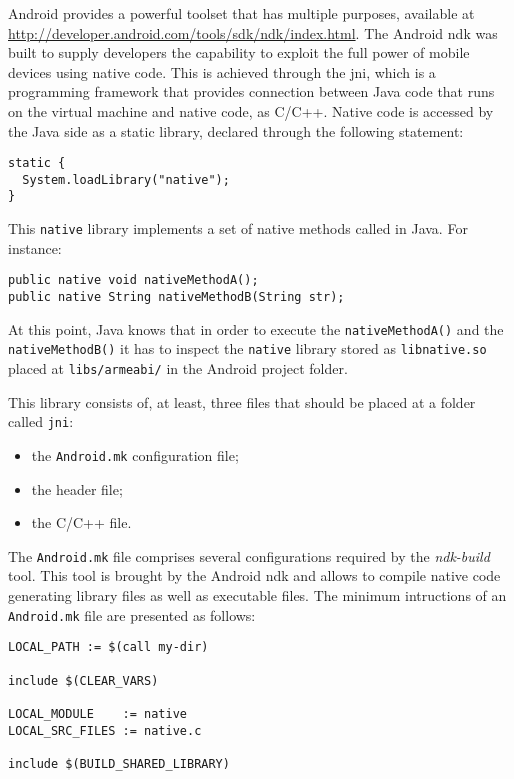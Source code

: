 Android provides a powerful toolset that has multiple purposes, available at \url{http://developer.android.com/tools/sdk/ndk/index.html}.  The Android \gls{ndk} was built to supply developers the capability to exploit the full power of mobile devices using native code. This is achieved through the \gls{jni}, which is a programming framework that provides connection between Java code that runs on the virtual machine and native code, as C/C++. Native code is accessed by the Java side as a static library, declared through the following statement:

\begin{lstlisting}[style=JavaInputStyle]
static { 
  System.loadLibrary("native");
}
\end{lstlisting}

This \texttt{native} library implements a set of native methods called in Java. For instance:

\begin{lstlisting}[style=JavaInputStyle]
public native void nativeMethodA();
public native String nativeMethodB(String str);
\end{lstlisting}

At this point, Java knows that in order to execute the \texttt{nativeMethodA()} and the \texttt{nativeMethodB()}  it has to inspect the \texttt{native} library stored as \texttt{libnative.so} placed at \texttt{libs/armeabi/} in the Android project folder.

This library consists of, at least, three files that should be placed at a folder called \texttt{jni}:

\begin{itemize}
\item the \texttt{Android.mk} configuration file;
\item the header file;
\item the C/C++ file.
\end{itemize}

The \texttt{Android.mk} file comprises several configurations required by the \textit{ndk-build} tool. This tool is brought by the Android \gls{ndk} and allows to compile native code generating library files as well as executable files. The minimum intructions of an \texttt{Android.mk} file are presented as follows:

\begin{lstlisting}[style=CInputStyle]
LOCAL_PATH := $(call my-dir)
 
include $(CLEAR_VARS)
       
LOCAL_MODULE    := native
LOCAL_SRC_FILES := native.c

include $(BUILD_SHARED_LIBRARY)
\end{lstlisting}

